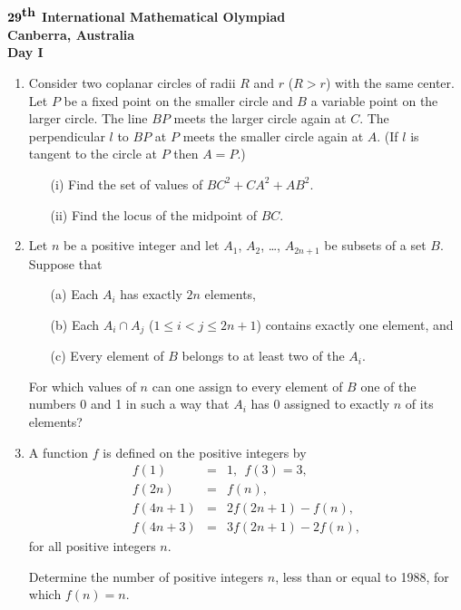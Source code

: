 \documentclass[12pt]{article}
\begin{document}
\begin{center}
${\bf 29}^{\mbox{\bf th}}$ {\bf International
Mathematical Olympiad} \\[.1in]
{\bf Canberra, Australia} \\ [.05in]
{\bf Day I}\\[.05in]
\end{center}

\vspace*{.3in}

\begin{enumerate}
\item
Consider two coplanar circles of radii $R$ and $r$ ($R > r$) with the same
center.  Let $P$ be a fixed point on the smaller circle and $B$ a variable
point on the larger circle.  The line $BP$ meets the larger circle again at
$C$.  The perpendicular $l$ to $BP$ at $P$ meets the smaller circle again at
$A$.  (If $l$ is tangent to the circle at $P$ then $A = P$.)
  \begin{enumerate}
  \item[(i)] Find the set of values of $BC^2 + CA^2 + AB^2$.
  \item[(ii)] Find the locus of the midpoint of $BC$.
  \end{enumerate}

\item
Let $n$ be a positive integer and let $A_1$, $A_2$, \ldots, $A_{2n+1}$ be
subsets of a set $B$.  Suppose that
  \begin{enumerate}
  \item[(a)] Each $A_i$ has exactly $2n$ elements,
  \item[(b)] Each $A_i \cap A_j$ ($1 \leq i < j \leq 2n + 1$) contains exactly
  one element, and
  \item[(c)] Every element of $B$ belongs to at least two of the $A_i$.
  \end{enumerate}
For which values of $n$ can one assign to every element of $B$ one of the
numbers 0 and 1 in such a way that $A_i$ has 0 assigned to exactly $n$ of its
elements?


\item
A function $f$ is defined on the positive integers by
\begin{eqnarray*}
f(1) &=& 1, \ \ f(3) = 3, \\
f(2n) &=& f(n), \\
f(4n + 1) &=& 2f(2n + 1) - f(n), \\
f(4n + 3) &=& 3f(2n + 1) - 2f(n),
\end{eqnarray*}
for all positive integers $n$.

Determine the number of positive integers $n$, less than or equal to 1988, for
which $f(n) = n$.
\end{enumerate}
\end{document}
